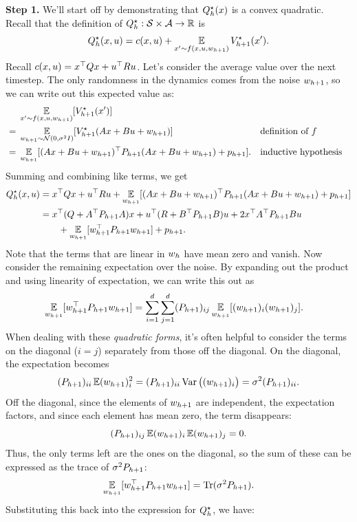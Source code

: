 \documentclass[../main/main]{subfiles}
\begin{document}
\textbf{Step 1.} We'll start off by demonstrating that $Q^\star_h(x)$ is a convex quadratic.
Recall that the definition of $Q^\star_h : \mathcal{S} \times \mathcal{A} \to \mathbb{R}$ is \[
    Q^\star_h(x, u) = c(x, u) + \operatorname*{\mathbb{E}}_{x' \sim f(x, u, w_{h+1})} V^\star_{h+1}(x').
\]
Recall $c(x, u) = x^\top Q x + u^\top R u$. Let's consider the average value
over the next timestep. The only randomness in the dynamics comes from the noise
$w_{h+1}$, so we can write out this expected value as:
\begin{align*}
    & \operatorname*{\mathbb{E}}_{x' \sim f(x, u, w_{h+1})} [V^\star_{h+1}(x')] \\
    {} = {} & \operatorname*{\mathbb{E}}_{w_{h+1} \sim \mathcal{N}(0, \sigma^2 I)} [V^\star_{h+1}(A x + B u + w_{h+1})] && \text{definition of } f \\
    {} = {} & \operatorname*{\mathbb{E}}_{w_{h+1}} [ (A x + B u + w_{h+1})^\top P_{h+1} (A x + B u + w_{h+1}) + p_{h+1} ]. && \text{inductive hypothesis}
\end{align*}
Summing and combining like terms, we get \begin{align*}
    Q^\star_h(x, u) &= x^\top Q x + u^\top R u + \operatorname*{\mathbb{E}}_{w_{h+1}} [(A x + B u + w_{h+1})^\top P_{h+1} (A x + B u + w_{h+1}) + p_{h+1}] \\
    &= x^\top (Q + A^\top P_{h+1} A)x + u^\top (R + B^\top P_{h+1} B) u + 2 x^\top A^\top P_{h+1} B u \\
    &\qquad + \operatorname*{\mathbb{E}}_{w_{h+1}} [w_{h+1}^\top P_{h+1} w_{h+1}] + p_{h+1}.
\end{align*}
Note that the terms that are linear in $w_h$ have mean zero and vanish.
Now consider the remaining expectation over the noise. By expanding out the product and using linearity of
expectation, we can write this out as \begin{align*}
    \operatorname*{\mathbb{E}}_{w_{h+1}} [w_{h+1}^\top P_{h+1} w_{h+1}] &= \sum_{i=1}^d \sum_{j=1}^d (P_{h+1})_{ij} \operatorname*{\mathbb{E}}_{w_{h+1}} [(w_{h+1})_i (w_{h+1})_j].
\end{align*}
When dealing with these \emph{quadratic forms}, it's often helpful to consider the terms
on the diagonal ($i = j$) separately from those off the diagonal. On the diagonal, the
expectation becomes \[ (P_{h+1})_{ii} \operatorname*{\mathbb{E}} (w_{h+1})_i^2 = (P_{h+1})_{ii} \operatorname*{\textrm{Var}} \big((w_{h+1})_i \big) = \sigma^2 (P_{h+1})_{ii}. \]
Off the diagonal, since the elements of $w_{h+1}$ are independent,
the expectation factors, and since each element has mean zero, the term disappears: \[ (P_{h+1})_{ij} \operatorname*{\mathbb{E}} (w_{h+1})_i \operatorname*{\mathbb{E}} (w_{h+1})_j = 0. \]
Thus, the only terms left are the ones on the diagonal, so the sum of these can
be expressed as the trace of $\sigma^2 P_{h+1}$: \[
    \operatorname*{\mathbb{E}}_{w_{h+1}} [w_{h+1}^\top P_{h+1} w_{h+1}] = \operatorname*{\textrm{Tr}}(\sigma^2 P_{h+1}).
\]
Substituting this back into the expression for $Q^\star_h$, we have:
\end{document}
